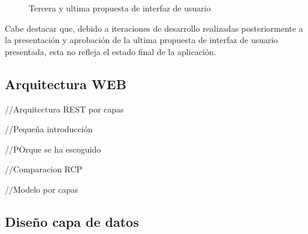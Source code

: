 \documentclass[11pt,a4paper]{article}
\begin{document}
\begin{figure}[H]
\centering
{}
\caption{Tercera y ultima propuesta de interfaz de usuario}
\end{figure}

Cabe destacar que, debido a iteraciones de desarrollo realizadas posteriormente a la presentación y aprobación de la ultima propuesta de interfaz de usuario presentada, esta no refleja el estado final de la aplicación.

\medskip 

\subsection{Arquitectura WEB}

//Arquitectura REST por capas

//Pequeña introducción

//POrque se ha escoguido

//Comparacion RCP

//Modelo por capas

\medskip 

\subsection{Diseño capa de datos}
\end{document}
